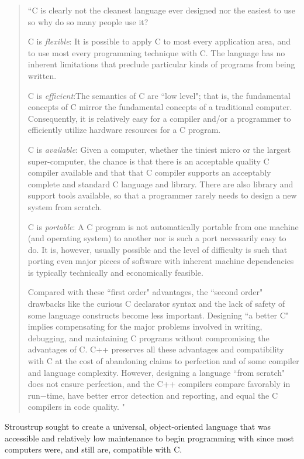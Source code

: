 \begin{quote}
\label{q:StroustrupCvsOther}
``C is clearly not the cleanest language ever designed nor the easiest to use so why do so many people use it?
\begin{enumerate}[label = {[\arabic*]}]
\item C is \textit{flexible}: It is possible to apply C to most every application area, and to use most every programming technique with C.  The language has no inherent limitations that preclude particular kinds of programs from being written.
\item C is \textit{efficient}:The semantics of C are ``low level"; that is, the fundamental concepts of C mirror the fundamental concepts of a traditional computer.  Consequently, it is relatively easy for a compiler and/or a programmer to efficiently utilize hardware resources for a C program.
\item C is \textit{available}: Given a computer, whether the tiniest micro or the largest super-computer, the chance is that there is an acceptable quality C compiler available and that that C compiler supports an acceptably complete and standard C language and library.  There are also library and support tools available, so that a programmer rarely needs to design a new system from scratch.
\item C is \textit{portable}: A C program is not automatically portable from one machine (and operating system) to another nor is such a port necessarily easy to do.  It is, however, usually possible and the level of difficulty is such that porting even major pieces of software with inherent machine dependencies is typically technically and economically feasible.
\end{enumerate}
Compared with these ``first order" advantages, the ``second order" drawbacks like the curious C declarator syntax and the lack of safety of some language constructs become less important. Designing ``a better C" implies compensating for the major problems involved in writing, debugging, and maintaining C programs without compromising the advantages of C. C++ preserves all these advantages and compatibility with C at the cost of abandoning claims to perfection and of some compiler and language complexity. However, designing a language ``from scratch" does not ensure perfection, and the C++ compilers compare favorably in run−time, have better error detection and reporting, and equal the C compilers in code quality. \cite{stroustrup1996history}"
\end{quote}
Stroustrup sought to create a universal, object-oriented language that was accessible and relatively low maintenance to begin programming with since most computers were, and still are, compatible with C.

